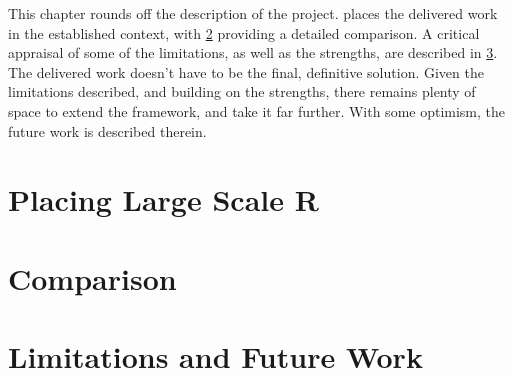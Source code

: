 This chapter rounds off the description of the project.
 places the delivered work in the established context, with \cref{sec:comp-lsr} providing a detailed comparison.
A critical appraisal of some of the limitations, as well as the strengths, are described in \cref{sec:lim-future}.
The delivered work doesn't have to be the final, definitive solution.
Given the limitations described, and building on the strengths, there remains plenty of space to extend the \lsr{} framework, and take it far further.
With some optimism, the future work is described therein.

\section{Placing Large Scale R}\label{sec:placing}

\section{Comparison}\label{sec:comp-lsr}

\section{Limitations and Future Work}\label{sec:lim-future}


